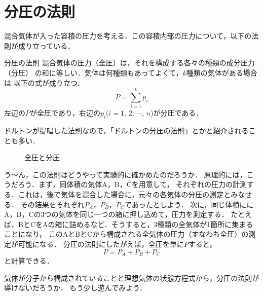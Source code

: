         \section{分圧の法則}
        混合気体が入った容積の圧力を考える．この容積内部の圧力について，以下の法則が成り立っている．
        \begin{myshadebox}{分圧の法則}
            混合気体の圧力（全圧）は，それを構成する各々の種類の成分圧力（分圧）
            の和に等しい．気体は何種類もあってよくて，$k$種類の気体がある場合は
            以下の式が成り立つ．
            \begin{equation}
                P = \sum_{i=1}^{k} {p}_{i}
            \end{equation}
            左辺の$P$が全圧であり，右辺の${p}_{i}$($i=1,\,2,\,\cdots,\,n$)が分圧である．
        \end{myshadebox}
        ドルトンが提唱した法則なので，「ドルトンの分圧の法則」とかと紹介されることも多い．

        \begin{figure}[hbt]
            \begin{center}
                \caption{全圧と分圧}
                \label{fig:netsurikigaku_bunsi_undo_ron_bunatsu}
            \end{center}
        \end{figure}

        う〜ん，この法則はどうやって実験的に確かめたのだろうか．
        原理的には，こうだろう．まず，同体積の気体A，B，Cを用意して，
        それぞれの圧力の計測する．これは，後で気体を混合した場合に，元々の各気体の分圧の測定とみなせる．
        その結果をそれぞれ${P}_{A}$，${P}_{B}$，${P}_{C}$であったとしよう．
        次に，同じ体積ににA，B，Cの3つの気体を同じ一つの箱に押し込めて，圧力を測定する．
        たとえば，BとCをAの箱に詰めるなど．そうすると，3種類の全気体が1箇所に集まることになり，
        このAとBとCから構成される全気体の圧力（すなわち全圧）の測定が可能になる．
        分圧の法則にしたがえば，全圧を単に$P$すると，
            \[
                P = {P}_{A} + {P}_{B} + {P}_{C}
            \]
        と計算できる．

        気体が分子から構成されていることと理想気体の状態方程式から，分圧の法則が導けないだろうか．
        もう少し遊んでみよう．
        
